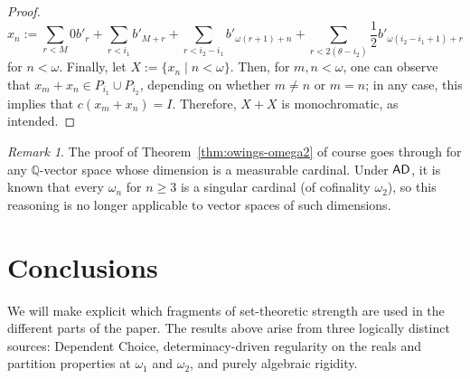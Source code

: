 \documentclass{amsart}
\theoremstyle{definition}
\newcommand{\ad}{\mathnormal{\mathsf{AD}}}
\theoremstyle{remark}
\newtheorem{remark}[theorem]{Remark}
\numberwithin{equation}{section}
\begin{document}
\begin{proof}
        \begin{equation*}
        x_{n}:=\sum_{r<M}0b'_{r}+\sum_{r<i_{1}}b'_{M+r}+\sum_{r<i_{2}-i_{1}} b'_{\omega(r+1)+n}+\sum_{r<2(\theta-i_{2})}\frac{1}{2}b'_{\omega(i_{2}-i_{1}+1)+r}
        \end{equation*}
        for $n<\omega$. Finally, let $X:=\{x_{n}\mid n<\omega\}$. Then, for $m, n<\omega$, one can observe that $x_{m}+x_{n}\in P_{i_{1}}\cup P_{i_2}$, depending on whether $m\neq n$ or $m=n$; in any case, this implies that $c(x_m+x_n)=I$. Therefore, $X + X$ is monochromatic, as intended.
\end{proof}

\begin{remark}
    The proof of Theorem~\ref{thm:owings-omega2} of course goes through for any $\mathbb Q$-vector space whose dimension is a measurable cardinal. Under $\ad$, it is known that every $\omega_n$ for $n\geq 3$ is a singular cardinal (of cofinality $\omega_2$), so this reasoning is no longer applicable to vector spaces of such dimensions.
\end{remark}

\section{Conclusions}\label{sec:choice-ad}

We will make explicit which fragments of set-theoretic strength are used in the different parts of the paper. 
The results above arise from three logically distinct sources: Dependent Choice, determinacy-driven regularity on the reals and partition properties at $\omega_1$ and $\omega_2$, and purely algebraic rigidity.
\end{document}
